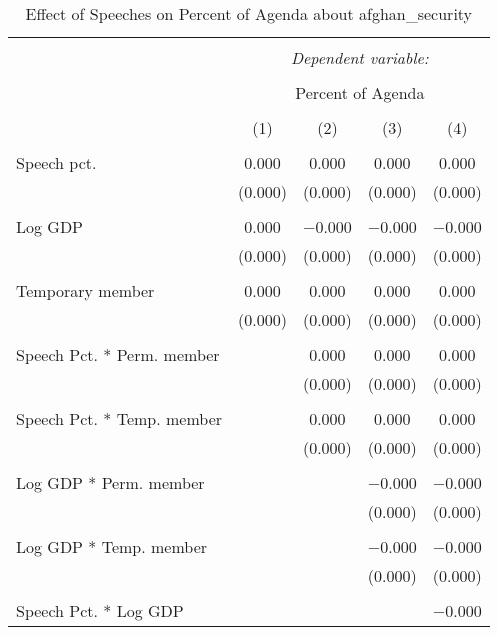 
\begin{table}[!htbp] \centering 
  \caption{Effect of Speeches on Percent of Agenda about  afghan_security} 
  \label{} 
\begin{tabular}{@{\extracolsep{5pt}}lcccc} 
\\[-1.8ex]\hline 
\hline \\[-1.8ex] 
 & \multicolumn{4}{c}{\textit{Dependent variable:}} \\ 
\cline{2-5} 
\\[-1.8ex] & \multicolumn{4}{c}{Percent of Agenda} \\ 
\\[-1.8ex] & (1) & (2) & (3) & (4)\\ 
\hline \\[-1.8ex] 
 Speech pct. & 0.000 & 0.000 & 0.000 & 0.000 \\ 
  & (0.000) & (0.000) & (0.000) & (0.000) \\ 
  & & & & \\ 
 Log GDP & 0.000 & $-$0.000 & $-$0.000 & $-$0.000 \\ 
  & (0.000) & (0.000) & (0.000) & (0.000) \\ 
  & & & & \\ 
 Temporary member & 0.000 & 0.000 & 0.000 & 0.000 \\ 
  & (0.000) & (0.000) & (0.000) & (0.000) \\ 
  & & & & \\ 
 Speech Pct. * Perm. member &  & 0.000 & 0.000 & 0.000 \\ 
  &  & (0.000) & (0.000) & (0.000) \\ 
  & & & & \\ 
 Speech Pct. * Temp. member &  & 0.000 & 0.000 & 0.000 \\ 
  &  & (0.000) & (0.000) & (0.000) \\ 
  & & & & \\ 
 Log GDP * Perm. member &  &  & $-$0.000 & $-$0.000 \\ 
  &  &  & (0.000) & (0.000) \\ 
  & & & & \\ 
 Log GDP * Temp. member &  &  & $-$0.000 & $-$0.000 \\ 
  &  &  & (0.000) & (0.000) \\ 
  & & & & \\ 
 Speech Pct. * Log GDP &  &  &  & $-$0.000 \\ 

\end{tabular}
\end{table}

